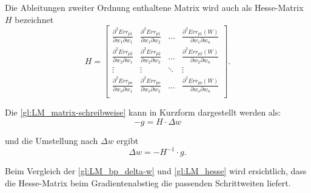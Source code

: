 Die Ableitungen zweiter Ordnung enthaltene Matrix wird auch als Hesse-Matrix $H$ bezeichnet
\begin{equation}
H
 =
 \begin{bmatrix}
    \frac{\partial^2 Err_{p1}}{\partial w_{1} \partial w_{1}} & \frac{\partial^2 Err_{p1}}{\partial w_{1} \partial w_{2}}  & \dots  & \frac{\partial^2 Err_{p1}(W)}{\partial w_{1} \partial w_{n}} \\
    \frac{\partial^2 Err_{p2}}{\partial w_{2} \partial w_{1}} & \frac{\partial^2 Err_{p2}}{\partial w_{2} \partial w_{2}}  & \dots  & \frac{\partial^2 Err_{p2}(W)}{\partial w_{2} \partial w_{n}} \\
    \vdots & \vdots & \ddots & \vdots \\
    \frac{\partial^2 Err_{po}}{\partial w_{o} \partial w_{1}} & \frac{\partial^2 Err_{po}}{\partial w_{o} \partial w_{2}}  & \dots  & \frac{\partial^2 Err_{po}(W)}{\partial w_{o} \partial w_{n}} \\
 \label{gl:LM_hesse-mat}
 \end{bmatrix}
 .
\end{equation}

Die \autoref{gl:LM_matrix-schreibweise} kann in Kurzform dargestellt werden als:
\begin{equation}
-g=H \cdot \Delta w
\end{equation}

und die Umstellung nach $\Delta w$ ergibt
\begin{equation}
\Delta w =-H^{-1} \cdot g.
\label{gl:LM_hesse}
\end{equation}

Beim Vergleich der \autoref{gl:LM_bp_delta-w} und \autoref{gl:LM_hesse} wird ersichtlich, dass die Hesse-Matrix beim Gradientenabstieg die passenden Schrittweiten liefert.


